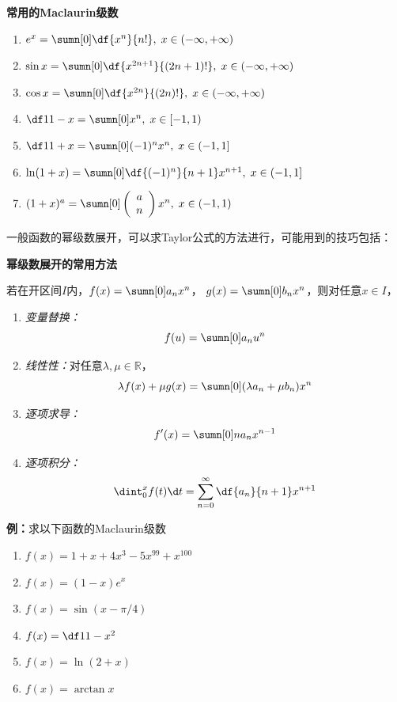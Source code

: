 \begin{thx}
	{\bf 常用的Maclaurin级数}
	\begin{enumerate}
	  \item $e^x=\sumn[0]\df{x^n}{n!},\;x\in(-\infty,+\infty)$
	  \item $\sin x=\sumn[0]\df{x^{2n+1}}{(2n+1)!},\;x\in(-\infty,+\infty)$
	  \item $\cos x=\sumn[0]\df{x^{2n}}{(2n)!},\;x\in(-\infty,+\infty)$
	  \item $\df1{1-x}=\sumn[0]x^n,\;x\in[-1,1)$
	  \item $\df1{1+x}=\sumn[0](-1)^nx^n,\;x\in(-1,1]$
	  \item $\ln(1+x)=\sumn[0]\df{(-1)^n}{n+1}x^{n+1},\;x\in(-1,1]$
	  \item $(1+x)^a=\sumn[0]\left(\begin{array}{c}
	  	a \\ n
	  \end{array}\right)x^n,\;x\in(-1,1)$
	\end{enumerate}
\end{thx}

一般函数的幂级数展开，可以求Taylor公式的方法进行，可能用到的技巧包括：

\begin{thx}
	{\bf 幂级数展开的常用方法}
	
	若在开区间$I$内，$f(x)=\sumn[0]a_nx^n$，
	$g(x)=\sumn[0]b_nx^n$，则对任意$x\in I$，
	\begin{enumerate}[(1)]
	  \item {\it 变量替换：}
	  $$f(u)=\sumn[0]a_nu^n$$
	  \item {\it 线性性：}对任意$\lambda,\mu\in\mathbb{R}$，
	  $$\lambda f(x)+\mu g(x)=\sumn[0](\lambda a_n+\mu
	  b_n)x^n$$ 
	  \item {\it 逐项求导：}
	  $$f'(x)=\sumn[0]na_{n}x^{n-1}$$ 
	  \item {\it 逐项积分：} 
	  $$\dint_0^x f(t)\d t=\sum\limits_{n=0}^{\infty}
	  \df{a_{n}}{n+1}x^{n+1}$$
	\end{enumerate}
\end{thx}

{\bf 例：}求以下函数的Maclaurin级数

\begin{enumerate}[(1)]
  \setlength{\itemindent}{1cm}
  \item $f(x)=1+x+4x^3-5x^{99}+x^{100}$
  \item $f(x)=(1-x)e^x$
  \item $f(x)=\sin(x-\pi/4)$
  \item $f(x)=\df 1{1-x^2}$
  \item $f(x)=\ln(2+x)$
  \item $f(x)=\arctan x$
\end{enumerate}

